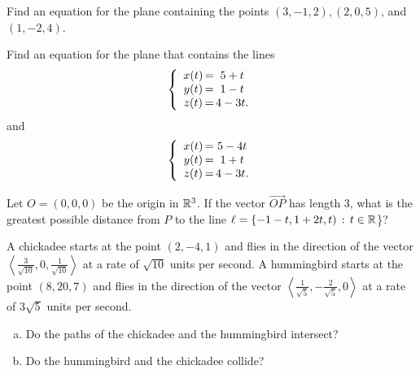 \documentclass[prettycode,shellescape]{watsonbook}
\begin{document}

\begin{aexercise}
  Find an equation for the plane containing the points $(3, -1, 2),
  (2, 0, 5)$, and $(1, -2, 4)$.
\end{aexercise}

\begin{aexercise}
  Find an equation for the plane that contains the lines
  \[
    \left\{
      \begin{array}{c@{\,}c@{\,}c}
        x(t)&=&5+t \\
        y(t)&=&1-t \\
        z(t)&=&4-3t. 
      \end{array}
    \right.
  \]
  and
  \[
    \left\{
      \begin{array}{c@{\,}c@{\,}c}
        x(t)&=&5-4t \\
        y(t)&=&1+t \\
        z(t)&=&4-3t. 
      \end{array}
    \right.
  \]
\end{aexercise}

\begin{aexercise}
  Let $O=(0,0,0)$ be the origin in $\mathbb{R}^3$. If the vector
  $\overrightarrow{OP}$ has length 3, what is the greatest possible
  distance from $P$ to the line
  $\ell = \{-1-t,1+2t,t) \,:\, t\in \mathbb{R}$\}?
\end{aexercise}


\begin{aexercise}
  A chickadee starts at the point $(2,-4,1)$ and flies in the direction
  of the vector
  $\left\langle\frac{3}{\sqrt{10}},0,\frac{1}{\sqrt{10}}\right\rangle$
  at a rate of $\sqrt{10}$ units per second. A hummingbird starts at the
  point $(8,20,7)$ and flies in the direction of the vector
  $\left\langle\frac{1}{\sqrt{5}},-\frac{2}{\sqrt{5}},0\right\rangle$ at
  a rate of $3\sqrt{5}$ units per second.

  \vspace{6pt}

  \begin{enumerate}[(a),itemsep=6pt]
  \item Do the paths of the chickadee and the hummingbird intersect? 
  \item Do the hummingbird and the chickadee collide?
  \end{enumerate}
\end{aexercise}
\end{document}
